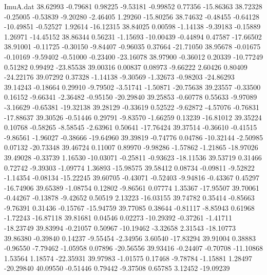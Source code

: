 \begin{filecontents}{ImuA.dat}
  38.62993   -0.79681    0.98225   -9.53181   -0.99852    0.77356  -15.86363
  38.72328   -0.25005   -0.53839   -9.20280   -2.46405    1.29260  -15.80256
  38.74632   -0.48455   -0.64128  -10.49851   -0.52527    1.92614  -16.12315
  38.84025    0.00598   -1.14138   -9.39183   -0.15889    1.26971  -14.45152
  38.86344    0.56231   -1.15693  -10.00439   -0.44894    0.47587  -17.66502
  38.91001   -0.11725   -0.30150   -9.84407   -0.96035    0.37664  -21.71050
  38.95678   -0.01675   -0.10169   -9.59402   -0.51000   -0.23400  -23.16078
  38.97900   -0.36012    0.20339  -10.77249    0.51282    0.99492  -23.85538
  39.00316    0.00837    0.08973   -9.66222    2.60426    0.80409  -24.22176
  39.07292    0.37328   -1.14138   -9.30569   -1.32673   -0.98203  -24.86293
  39.14243   -0.18664    0.29910   -9.79502   -3.51741   -1.50871  -20.75638
  39.23557   -0.33500    0.16152   -9.66341   -2.36482   -0.95150  -20.29840
  39.25853   -0.60778    0.55633   -9.97089   -3.16629   -0.65381  -19.32138
  39.28129   -0.33619    0.52522   -9.62872   -4.57076   -0.76831  -17.88637
  39.30526   -0.51446    0.29791   -9.83570   -1.66259    0.13239  -16.81012
  39.35224    0.10768   -0.58265   -8.58545   -2.63961    0.50641  -17.76424
  39.37514   -0.36610   -0.41515   -9.86561   -1.96027   -0.38666  -19.64960
  39.39819   -0.74776    0.04786  -10.32144   -2.50985    0.07132  -20.73348
  39.46724    0.11007    0.89970   -9.98286   -1.57862   -1.21865  -18.97026
  39.49028   -0.33739    1.16530  -10.03071   -0.25811   -0.93623  -18.11536
  39.53719    0.31466    0.72742   -9.39303   -1.09774    1.36893  -15.98575
  39.58412    0.08734   -0.09811   -9.52822   -1.14354   -0.08134  -15.22245
  39.60705   -0.43071   -0.52403   -9.94816   -0.43367    0.45297  -16.74906
  39.65389   -1.08754    0.12802   -9.86561    0.07774    1.35367  -17.95507
  39.70061   -0.44267   -0.13878   -9.42652    0.50519    2.13223  -16.03155
  39.74782    0.35414   -0.85663   -9.76391    0.31436   -0.15767  -15.94759
  39.77085    0.38644   -0.81117   -8.85943    0.61968   -1.72243  -16.87118
  39.81681    0.04546    0.02273  -10.29392   -0.37261   -1.41711  -18.23749
  39.83994   -0.21057    0.50967  -10.19462   -3.32658    2.31543  -18.10773
  39.86380   -0.39840    0.14237   -9.55454   -2.34956    3.60540  -17.83294
  39.91004    0.38883   -0.96550   -7.79462   -1.05958    0.07896  -20.56556
  39.93416   -0.24407   -0.70708  -11.10868    1.53564    1.18574  -22.35931
  39.97983   -1.01575    0.17468   -9.78784   -1.15881    1.28497  -20.29840
  40.09550   -0.51446    0.79442   -9.37508    0.65785    3.12452  -19.09239

\end{filecontents}
